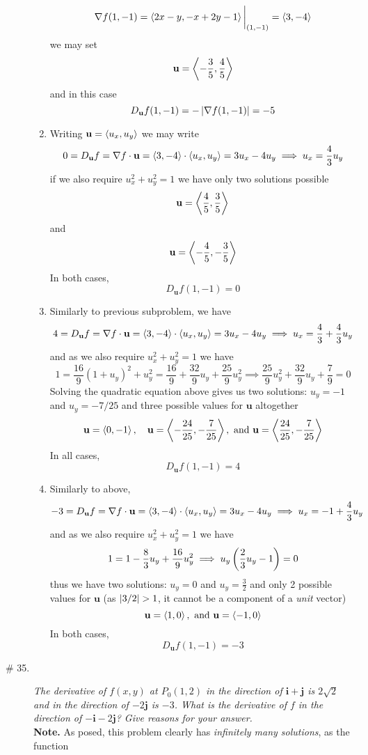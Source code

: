 \documentclass[8pt]{article} %
\begin{document}
\begin{description}
\begin{enumerate}[\bfseries a.]
				\[\nabla f(1,-1)=\left<2x-y,-x+2y-1\right>\bigg|_{(1,-1)}=\left<3,-4\right>\]
				we may set \[\mathbf{u}=\left<-\frac{3}{5},\frac{4}{5}\right>\]
				and in this case
				\[D_{\mathbf{u}}f(1,-1)=-\left|\nabla f(1,-1)\right|=-5\]
			\item Writing $\mathbf{u}=\left<u_x,u_y\right>$ we may write
				\[0=D_{\mathbf{u}}f=\nabla f\cdot\mathbf{u}=\left<3,-4\right>\cdot\left<u_x,u_y\right>=3u_x-4u_y\implies u_x=\frac{4}{3}u_y\]
				if we also require $u_x^2+u_y^2=1$ we have only two solutions possible
				\[\mathbf{u}=\left<\frac{4}{5},\frac{3}{5}\right>\]
				and
				\[\mathbf{u}=\left<-\frac{4}{5},-\frac{3}{5}\right>\]
				In both cases,
				\[D_{\mathbf{u}}f(1,-1)=0\]
			\item Similarly to previous subproblem, we have
				\[4=D_{\mathbf{u}}f=\nabla f\cdot\mathbf{u}=\left<3,-4\right>\cdot\left<u_x,u_y\right>=3u_x-4u_y
				\implies u_x=\frac{4}{3}+\frac{4}{3}u_y\]
				and as we also require $u_x^2+u_y^2=1$ we have
				\[1=\frac{16}{9}(1+u_y)^2+u_y^2=\frac{16}{9}+\frac{32}{9}u_y+\frac{25}{9}u_y^2\implies \frac{25}{9}u_y^2+\frac{32}
				{9}u_y+\frac{7}{9}=0\]
				Solving the quadratic equation above gives us two solutions: $u_y=-1$ and $u_y=-7/25$ and three possible values
				for $\mathbf{u}$ altogether
				\[\mathbf{u}=\left<0,-1\right>,\quad \mathbf{u}=\left<-\frac{24}{25},-\frac{7}{25}\right>,\mbox{ and }
				\mathbf{u}=\left<\frac{24}{25},-\frac{7}{25}\right>\]
				In all cases,
				\[D_{\mathbf{u}}f(1,-1)=4\]
			\item Similarly to above,
				\[-3=D_{\mathbf{u}}f=\nabla f\cdot\mathbf{u}=\left<3,-4\right>\cdot\left<u_x,u_y\right>=3u_x-4u_y\implies u_x=-1+\frac{4}{3}
				u_y\]
				and as we also require $u_x^2+u_y^2=1$ we have
				\[1=1-\frac{8}{3}u_y+\frac{16}{9}u_y^2\implies u_y\left(\frac{2}{3}u_y-1\right)=0\]
				thus we have two solutions: $u_y=0$ and $u_y=\frac{3}{2}$ and only 2 possible values for $\mathbf{u}$ (as
				$\myabs{3/2}>1$, it cannot be a component of a \textit{unit} vector)
				\[\mathbf{u}=\left<1,0\right>,\mbox{ and }\mathbf{u}=\left<-1,0\right>\]
				In both cases,
				\[D_{\mathbf{u}}f(1,-1)=-3\]
		\end{enumerate}
	\item[\# 35.]{{\it The derivative of $f(x,y)$ at $P_0(1,2)$ in the direction of $\mathbf{i}+\mathbf{j}$ is $2\sqrt{2}$ and in the direction
		of $-2\mathbf{j}$ is $-3$. What is the derivative of $f$ in the direction of $-\mathbf{i}-2\mathbf{j}$? Give reasons for your answer.
		}\\
		\textbf{Note.} As posed, this problem clearly has {\it infinitely many solutions}, as the function
}
\end{description}
\end{document}
